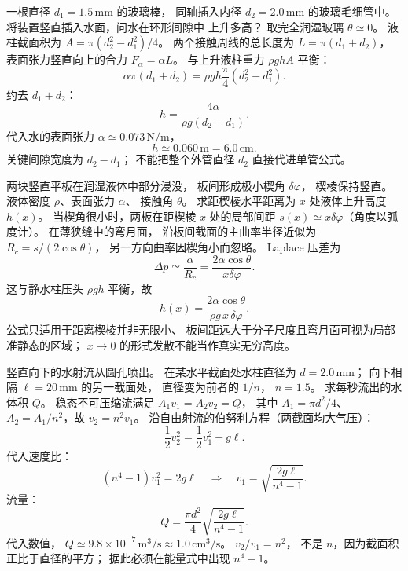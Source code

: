 一根直径 $d_1=1.5\,\mathrm{mm}$ 的玻璃棒，
同轴插入内径 $d_2=2.0\,\mathrm{mm}$
的玻璃毛细管中。
将装置竖直插入水面，问水在环形间隙中
上升多高？
\exsolution
取完全润湿玻璃 $\theta\simeq0$。
液柱截面积为
$A=\pi(d_2^2-d_1^2)/4$。
两个接触周线的总长度为
$L=\pi(d_1+d_2)$，
表面张力竖直向上的合力
$F_\alpha=\alpha L$。
与上升液柱重力
$\rho gh A$ 平衡：
\[
\alpha\pi(d_1+d_2)
=\rho gh\frac{\pi}{4}(d_2^2-d_1^2).
\]
约去 $d_1+d_2$：
\[
\boxed{h=\frac{4\alpha}{\rho g(d_2-d_1)}}.
\]
代入水的表面张力
$\alpha\simeq0.073\,\mathrm{N/m}$，
\[
\boxed{h\simeq0.060\,\mathrm m=6.0\,\mathrm{cm}}.
\]
\excheck 关键间隙宽度为 $d_2-d_1$；
不能把整个外管直径 $d_2$ 直接代进单管公式。

两块竖直平板在润湿液体中部分浸没，
板间形成极小楔角 $\delta\varphi$，
楔棱保持竖直。
液体密度 $\rho$、表面张力 $\alpha$、
接触角 $\theta$。
求距楔棱水平距离为 $x$ 处液体上升高度 $h(x)$。
\exsolution
当楔角很小时，两板在距楔棱 $x$ 处的局部间距
$s(x)\simeq x\delta\varphi$（角度以弧度计）。
在薄狭缝中的弯月面，
沿板间截面的主曲率半径近似为
$R_c=s/(2\cos\theta)$，
另一方向曲率因楔角小而忽略。
Laplace 压差为
\[
\Delta p\simeq\frac{\alpha}{R_c}
=\frac{2\alpha\cos\theta}{x\delta\varphi}.
\]
这与静水柱压头 $\rho gh$ 平衡，故
\[
\boxed{h(x)=\frac{2\alpha\cos\theta}
{\rho g\,x\,\delta\varphi}}.
\]
\excheck 公式只适用于距离楔棱并非无限小、
板间距远大于分子尺度且弯月面可视为局部准静态的区域；
$x\to0$ 的形式发散不能当作真实无穷高度。

竖直向下的水射流从圆孔喷出。
在某水平截面处水柱直径为
$d=2.0\,\mathrm{mm}$；
向下相隔
$\ell=20\,\mathrm{mm}$ 的另一截面处，
直径变为前者的 $1/n$，
$n=1.5$。
求每秒流出的水体积 $Q$。
\exsolution
稳态不可压缩流满足
$A_1v_1=A_2v_2=Q$，
其中
$A_1=\pi d^2/4$、
$A_2=A_1/n^2$，故
$v_2=n^2v_1$。
沿自由射流的伯努利方程（两截面均大气压）：
\[
\frac12v_2^2=\frac12v_1^2+g\ell.
\]
代入速度比：
\[
(n^4-1)v_1^2=2g\ell
\quad\Longrightarrow\quad
v_1=\sqrt{\frac{2g\ell}{n^4-1}}.
\]
流量：
\[
\boxed{Q=\frac{\pi d^2}{4}
\sqrt{\frac{2g\ell}{n^4-1}}}.
\]
代入数值，
$\boxed{Q\simeq9.8\times10^{-7}\,\mathrm{m^3/s}
\approx1.0\,\mathrm{cm^3/s}}$。
\excheck $v_2/v_1=n^2$，
不是 $n$，因为截面积正比于直径的平方；
据此必须在能量式中出现 $n^4-1$。

